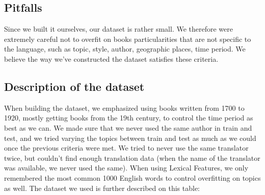 \documentclass[10pt]{article}
\begin{document}
\subsection{Pitfalls}
Since we built it ourselves, our dataset is rather small. We therefore were extremely careful not to overfit on books particularities that are not specific to the language, such as topic, style, author, geographic places, time period. We believe the way we've constructed the dataset satisfies these criteria. 
\subsection{Description of the dataset}
When building the dataset, we emphasized using books written from 1700 to 1920, mostly getting books from the 19th century, to control the time period as best as we can. We made sure that we never used the same author in train and test, and we tried varying the topics between train and test as much as we could once the previous criteria were met. We tried to never use the same translator twice, but couldn't find enough translation data (when the name of the translator was available, we never used the same). When using Lexical Features, we only remembered the most common 1000 English words to control overfitting on topics as well.
The dataset we used is further described on this table:
\end{document}
